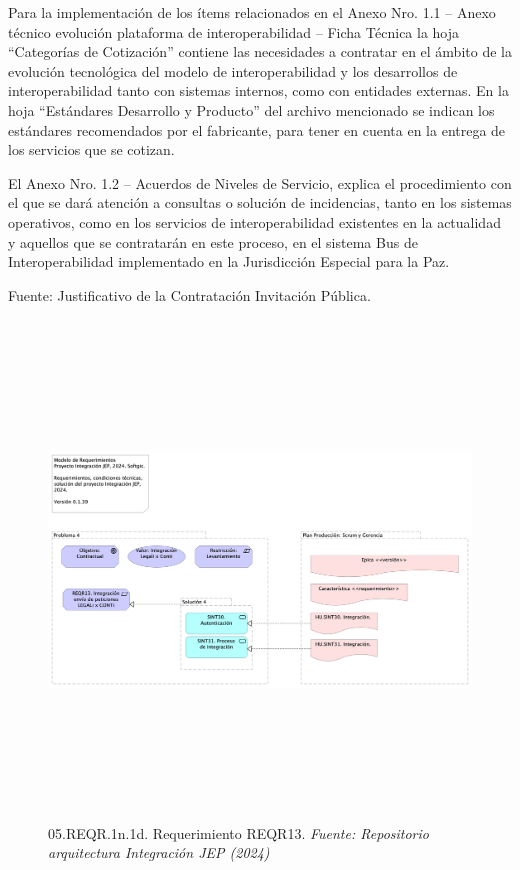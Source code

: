 \documentclass[
  paper=a4,
  ,captions=tableheading
]{scrartcl}
\begin{document}
Para la implementación de los ítems relacionados en el Anexo Nro. 1.1 --
Anexo técnico evolución plataforma de interoperabilidad -- Ficha Técnica
la hoja ``Categorías de Cotización'' contiene las necesidades a
contratar en el ámbito de la evolución tecnológica del modelo de
interoperabilidad y los desarrollos de interoperabilidad tanto con
sistemas internos, como con entidades externas. En la hoja ``Estándares
Desarrollo y Producto'' del archivo mencionado se indican los estándares
recomendados por el fabricante, para tener en cuenta en la entrega de
los servicios que se cotizan.

El Anexo Nro. 1.2 -- Acuerdos de Niveles de Servicio, explica el
procedimiento con el que se dará atención a consultas o solución de
incidencias, tanto en los sistemas operativos, como en los servicios de
interoperabilidad existentes en la actualidad y aquellos que se
contratarán en este proceso, en el sistema Bus de Interoperabilidad
implementado en la Jurisdicción Especial para la Paz.

Fuente: Justificativo de la Contratación Invitación Pública.

\begin{figure}
\centering
\includegraphics[width=\textwidth,height=5.20833in]{images/05.REQR.1n.1d.RequerimientoREQR13.png}
\caption{05.REQR.1n.1d. Requerimiento REQR13. \emph{Fuente: Repositorio
arquitectura Integración JEP
(2024)}}\label{fig:id-c16e7b2e768c4de7ab50fb13972e5c08}
\end{figure}
\end{document}
